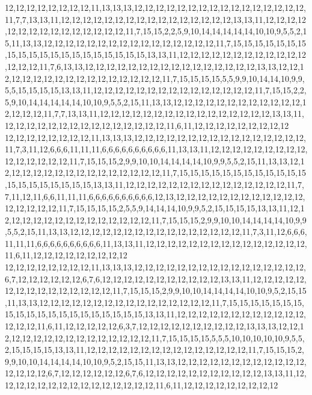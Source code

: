 12,12,12,12,12,12,12,12,11,13,13,13,12,12,12,12,12,12,12,12,12,12,12,12,12,12,12,12,11,7,7,13,13,11,12,12,12,12,12,12,12,12,12,12,12,12,12,12,12,12,13,13,11,12,12,12,12,12,12,12,12,12,12,12,12,12,12,12,11,7,15,15,2,2,5,9,10,14,14,14,14,14,10,10,9,5,5,2,15,11,13,13,12,12,12,12,12,12,12,12,12,12,12,12,12,12,12,12,11,7,15,15,15,15,15,15,15,15,15,15,15,15,15,15,15,15,15,15,15,15,13,13,11,12,12,12,12,12,12,12,12,12,12,12,12,12,12,12,11,7,6,13,13,12,12,12,12,12,12,12,12,12,12,12,12,12,12,12,12,13,13,12,12,12,12,12,12,12,12,12,12,12,12,12,12,12,12,12,11,7,15,15,15,15,5,5,9,9,10,14,14,10,9,9,5,5,15,15,15,15,13,13,11,12,12,12,12,12,12,12,12,12,12,12,12,12,12,12,11,7,15,15,2,2,5,9,10,14,14,14,14,14,10,10,9,5,5,2,15,11,13,13,12,12,12,12,12,12,12,12,12,12,12,12,12,12,12,12,11,7,7,13,13,11,12,12,12,12,12,12,12,12,12,12,12,12,12,12,12,12,13,13,11,12,12,12,12,12,12,12,12,12,12,12,12,12,12,12,11,6,11,12,12,12,12,12,12,12,12,12
12,12,12,12,12,12,12,12,11,13,13,13,12,12,12,12,12,12,12,12,12,12,12,12,12,12,12,12,11,7,3,11,12,6,6,6,11,11,11,6,6,6,6,6,6,6,6,6,6,11,13,13,11,12,12,12,12,12,12,12,12,12,12,12,12,12,12,12,11,7,15,15,15,2,9,9,10,10,14,14,14,14,10,9,9,5,5,2,15,11,13,13,12,12,12,12,12,12,12,12,12,12,12,12,12,12,12,12,11,7,15,15,15,15,15,15,15,15,15,15,15,15,15,15,15,15,15,15,15,15,13,13,11,12,12,12,12,12,12,12,12,12,12,12,12,12,12,12,11,7,7,11,12,11,6,6,11,11,11,6,6,6,6,6,6,6,6,6,6,12,13,12,12,12,12,12,12,12,12,12,12,12,12,12,12,12,12,12,11,7,15,15,15,15,2,5,5,9,14,14,14,10,9,9,5,2,15,15,15,15,13,13,11,12,12,12,12,12,12,12,12,12,12,12,12,12,12,12,11,7,15,15,15,2,9,9,10,10,14,14,14,14,10,9,9,5,5,2,15,11,13,13,12,12,12,12,12,12,12,12,12,12,12,12,12,12,12,12,11,7,3,11,12,6,6,6,11,11,11,6,6,6,6,6,6,6,6,6,6,11,13,13,11,12,12,12,12,12,12,12,12,12,12,12,12,12,12,12,11,6,11,12,12,12,12,12,12,12,12,12
12,12,12,12,12,12,12,12,11,13,13,13,12,12,12,12,12,12,12,12,12,12,12,12,12,12,12,12,6,7,12,12,12,12,12,12,6,7,6,12,12,12,12,12,12,12,12,12,12,12,13,13,11,12,12,12,12,12,12,12,12,12,12,12,12,12,12,12,11,7,15,15,15,2,9,9,10,10,14,14,14,14,10,10,9,5,2,15,15,11,13,13,12,12,12,12,12,12,12,12,12,12,12,12,12,12,12,12,11,7,15,15,15,15,15,15,15,15,15,15,15,15,15,15,15,15,15,15,15,15,13,13,11,12,12,12,12,12,12,12,12,12,12,12,12,12,12,12,11,6,11,12,12,12,12,12,6,3,7,12,12,12,12,12,12,12,12,12,12,13,13,13,12,12,12,12,12,12,12,12,12,12,12,12,12,12,12,12,11,7,15,15,15,15,5,5,5,10,10,10,10,10,9,5,5,2,15,15,15,15,13,13,11,12,12,12,12,12,12,12,12,12,12,12,12,12,12,12,11,7,15,15,15,2,9,9,10,10,14,14,14,14,10,10,9,5,2,15,15,11,13,13,12,12,12,12,12,12,12,12,12,12,12,12,12,12,12,12,6,7,12,12,12,12,12,12,6,7,6,12,12,12,12,12,12,12,12,12,12,12,13,13,11,12,12,12,12,12,12,12,12,12,12,12,12,12,12,12,11,6,11,12,12,12,12,12,12,12,12,12
